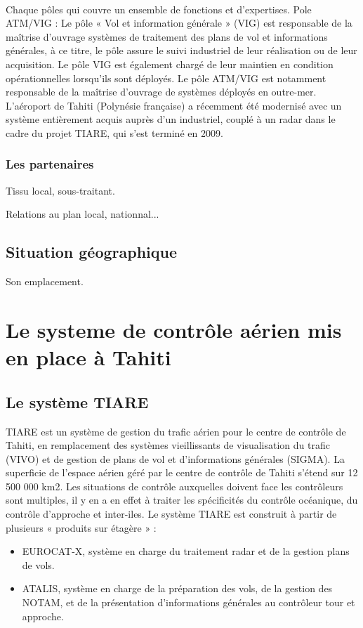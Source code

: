             \paragraph{}
Chaque pôles qui couvre un ensemble de fonctions et d’expertises.
Pole ATM/VIG :
Le pôle « Vol et information générale » (VIG) est responsable de la maîtrise d’ouvrage systèmes de traitement des plans de vol et informations générales, à ce titre, le pôle assure le suivi industriel de leur réalisation ou de leur acquisition. Le pôle VIG est également chargé de leur maintien en condition opérationnelles lorsqu’ils sont déployés.
Le pôle ATM/VIG est notamment responsable de la maîtrise d’ouvrage de systèmes déployés en outre-mer. L’aéroport de Tahiti (Polynésie française) a récemment été modernisé avec un système entièrement acquis auprès d’un industriel, couplé à un radar dans le cadre du projet TIARE, qui s’est terminé en 2009.

    \subsubsection{Les partenaires}
        Tissu local, sous-traitant.
        
        Relations au plan local, nationnal...

    \subsection{Situation géographique}
    
        Son emplacement.

\section[Controle aérien à Thaiti]{Le systeme de contrôle aérien mis en place à Tahiti}
    \subsection{Le système TIARE}
TIARE est un système de gestion du trafic aérien pour le centre de contrôle de Tahiti, en remplacement des systèmes vieillissants de visualisation du trafic (VIVO) et de gestion de plans de vol et d’informations générales (SIGMA). La superficie de l'espace aérien géré par le centre de contrôle de Tahiti s’étend sur 12 500 000 km2. Les situations de contrôle auxquelles doivent face les contrôleurs sont multiples, il y en a en effet à traiter les spécificités du contrôle océanique, du contrôle d’approche et inter-iles. Le système TIARE est construit à partir de plusieurs « produits sur étagère » :
\begin{itemize}
\item EUROCAT-X, système en charge du traitement radar et de la gestion plans de vols.
\item ATALIS, système en charge de la préparation des vols, de la gestion des NOTAM, et de la présentation d’informations générales au contrôleur tour et approche.
\end{itemize}


